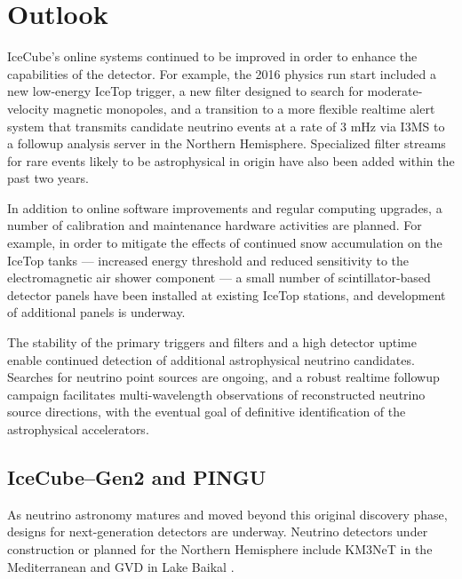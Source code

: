 \section{Outlook}

IceCube's online systems continued to be improved in order to enhance the
capabilities of the detector.  For example, the 2016 physics run start
included a new low-energy IceTop trigger, a new filter designed to search for
moderate-velocity magnetic monopoles, and a transition to a more flexible
realtime alert system that transmits candidate neutrino events at a rate of
3 mHz via I3MS to a followup analysis server in the Northern Hemisphere.
Specialized filter streams for rare events likely to be astrophysical in
origin have also been added within the past two years.  

In addition to online software improvements and regular computing upgrades, a
number of calibration and maintenance hardware activities are 
planned. For example, in order to mitigate the effects of continued snow
accumulation on the IceTop tanks --- increased energy threshold and reduced
sensitivity to the electromagnetic air shower component --- a small number
of scintillator-based  detector panels have been installed at existing
IceTop stations, and development of additional panels is underway.

The stability of the primary triggers and filters and a high detector
uptime enable continued detection of additional astrophysical neutrino
candidates.  Searches for neutrino point sources are ongoing, and a robust
realtime followup campaign facilitates multi-wavelength observations of
reconstructed neutrino source directions, with the eventual goal of
definitive identification of the astrophysical accelerators.

\subsection{IceCube--Gen2 and PINGU}

As neutrino astronomy matures and moved beyond this original discovery phase, designs
for next-generation detectors are underway.   Neutrino
detectors under construction or planned for the Northern Hemisphere include
KM3NeT in the Mediterranean \cite{km3net} and GVD in Lake Baikal \cite{gvd}.  

